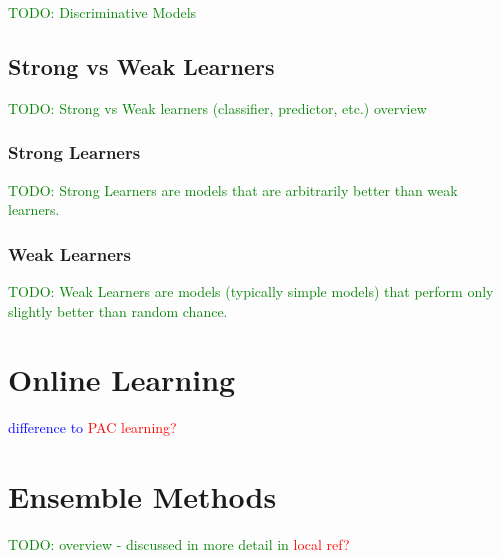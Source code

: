 \textcolor{green}{TODO: Discriminative Models}

\subsection{Strong vs Weak Learners}

\textcolor{green}{TODO: Strong vs Weak learners (classifier, predictor, etc.) overview}

\subsubsection{Strong Learners}

\textcolor{green}{TODO: Strong Learners are models that are arbitrarily better than weak learners.}

\subsubsection{Weak Learners}

\textcolor{green}{TODO: Weak Learners are models (typically simple models) that perform only slightly better than random chance. }


\section{Online Learning}

\textcolor{blue}{difference to \textcolor{red}{PAC learning?}}

\section{Ensemble Methods}

\textcolor{green}{TODO: overview - discussed in more detail in \textcolor{red}{local ref?}}








